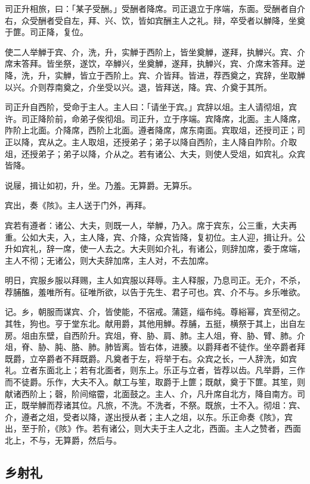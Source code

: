 \documentclass[]{article}
\begin{document}
司正升相旅，曰：「某子受酬。」受酬者降席。司正退立于序端，东面。受酬者自介右，众受酬者受自左，拜、兴、饮，皆如宾酬主人之礼。辩，卒受者以觯降，坐奠于篚。司正降，复位。

使二人举觯于宾、介，洗，升，实觯于西阶上，皆坐奠觯，遂拜，执觯兴。宾、介席末答拜。皆坐祭，遂饮，卒觯兴，坐奠觯，遂拜，执觯兴，宾、介席末答拜。逆降，洗，升，实觯，皆立于西阶上。宾、介皆拜。皆进，荐西奠之，宾辞，坐取觯以兴。介则荐南奠之，介坐受以兴。退，皆拜送，降。宾、介奠于其所。

司正升自西阶，受命于主人。主人曰：「请坐于宾。」宾辞以俎。主人请彻俎，宾许。司正降阶前，命弟子俟彻俎。司正升，立于序端。宾降席，北面。主人降席，阼阶上北面。介降席，西阶上北面。遵者降席，席东南面。宾取俎，还授司正；司正以降，宾从之。主人取俎，还授弟子；弟子以降自西阶，主人降自阼阶。介取俎，还授弟子；弟子以降，介从之。若有诸公、大夫，则使人受俎，如宾礼。众宾皆降。

说屦，揖让如初，升，坐。乃羞。无算爵。无算乐。

宾出，奏《陔》。主人送于门外，再拜。

宾若有遵者：诸公、大夫，则既一人，举觯，乃入。席于宾东，公三重，大夫再重。公如大夫，入，主人降，宾、介降，众宾皆降，复初位。主人迎，揖让升。公升如宾礼，辞一席，使一人去之。大夫则如介礼，有诸公，则辞加席，委于席端，主人不彻；无诸公，则大夫辞加席，主人对，不去加席。

明日，宾服乡服以拜赐，主人如宾服以拜辱。主人释服，乃息司正。无介，不杀，荐脯醢，羞唯所有。征唯所欲，以告于先生、君子可也。宾、介不与。乡乐唯欲。

记。乡，朝服而谋宾、介，皆使能，不宿戒。蒲筵，缁布纯。尊綌幂，宾至彻之。其牲，狗也。亨于堂东北。献用爵，其他用觯。荐脯，五挺，横祭于其上，出自左房。俎由东壁，自西阶升。宾俎，脊、胁、肩、肺。主人俎，脊、胁、臂、肺。介俎，脊、胁、肫、胳、肺。肺皆离。皆右体，进腠。以爵拜者不徒作。坐卒爵者拜既爵，立卒爵者不拜既爵。凡奠者于左，将举于右。众宾之长，一人辞洗，如宾礼。立者东面北上；若有北面者，则东上。乐正与立者，皆荐以齿。凡举爵，三作而不徒爵。乐作，大夫不入。献工与笙，取爵于上篚；既献，奠于下篚。其笙，则献诸西阶上；磬，阶间缩霤，北面鼓之。主人、介，凡升席自北方，降自南方。司正，既举觯而荐诸其位。凡旅，不洗。不洗者，不祭。既旅，士不入。彻俎：宾、介，遵者之俎，受者以降，遂出授从者；主人之俎，以东。乐正命奏《陔》，宾出，至于阶，《陔》作。若有诸公，则大夫于主人之北，西面。主人之赞者，西面北上，不与，无算爵，然后与。

\hypertarget{header-n28}{%
\subsection{乡射礼}\label{header-n28}}
\end{document}
